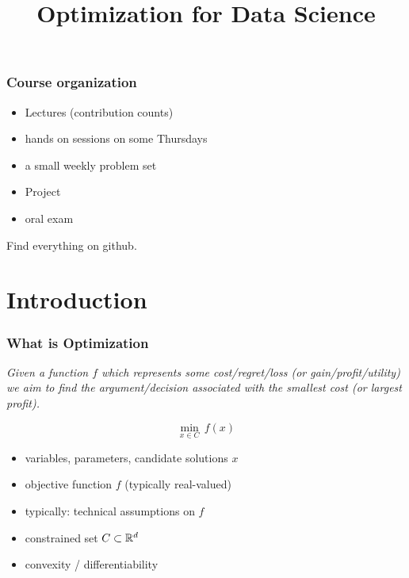 \documentclass{beamer}
\title{Optimization for Data Science}
\begin{document}
\maketitle
\frame{\tableofcontents}

\begin{frame}
  \frametitle{Course organization}
  \begin{itemize}
    \item Lectures (contribution counts)
    \item hands on sessions on some Thursdays
    \item a small weekly problem set
    \item Project
    \item oral exam
  \end{itemize}

  Find everything on github.

\end{frame}



\section{Introduction}

\begin{frame}
  \frametitle{What is Optimization}

  \begin{center}
    \textit{Given a function $f$ which represents some cost/regret/loss (or gain/profit/utility) we aim to find the argument/decision associated with the smallest cost (or largest profit).}
  \end{center}

  \begin{equation}
    \min_{x\in C } \, f(x)
  \end{equation}

  \begin{itemize}
    \item variables, parameters, candidate solutions $x$
    \item objective function $f$ (typically real-valued)
    \item typically: technical assumptions on $f$
    \item constrained set $C \subset \mathbb{R}^d$
    \item convexity / differentiability
  \end{itemize}
\end{frame}
\end{document}
